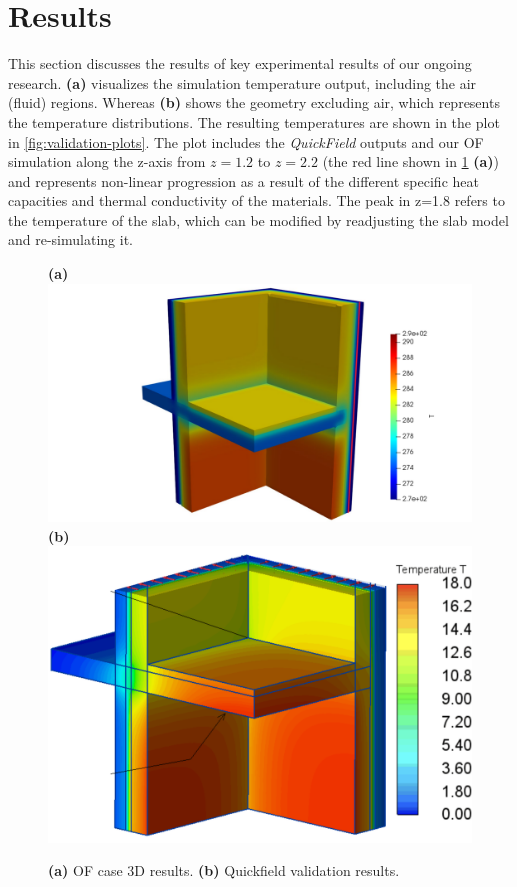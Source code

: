 \afterpage{\clearpage}
\section{Results}

This section discusses the results of key experimental results of our ongoing research. 
 \textbf{(a)} visualizes the simulation temperature output, including the air (fluid) regions. Whereas
 \textbf{(b)} shows the geometry excluding air, which represents the temperature distributions. The resulting temperatures are shown in the plot in \cref{fig:validation-plots}. The plot includes the \textit{QuickField} outputs and our  \gls{OF} simulation along the z-axis from $z= 1.2$ to $z=2.2$ (the red line shown in \cref{paraview} \textbf{(a)}) and represents non-linear progression as a result of the different specific heat capacities and thermal conductivity of the materials. The peak in z=1.8 refers to the temperature of the slab, which can be modified by readjusting the slab model and re-simulating it. 



\begin{figure}[htb]
    \centering
    \textbf{(a)}\includegraphics[trim=5cm 0cm 4.5cm 0cm, clip, width=0.70\linewidth]{Figures/newvalleg.pdf}
    \textbf{(b)}\includegraphics[width=0.65\columnwidth]{Figures/ValidationCaseClean.png}
\hspace{0.7cm}
    \caption[3D Validation Visualization]{\textbf{(a)} \gls{OF} case 3D results. \textbf{(b)} Quickfield validation results.}
    \label{paraview}
\end{figure}



